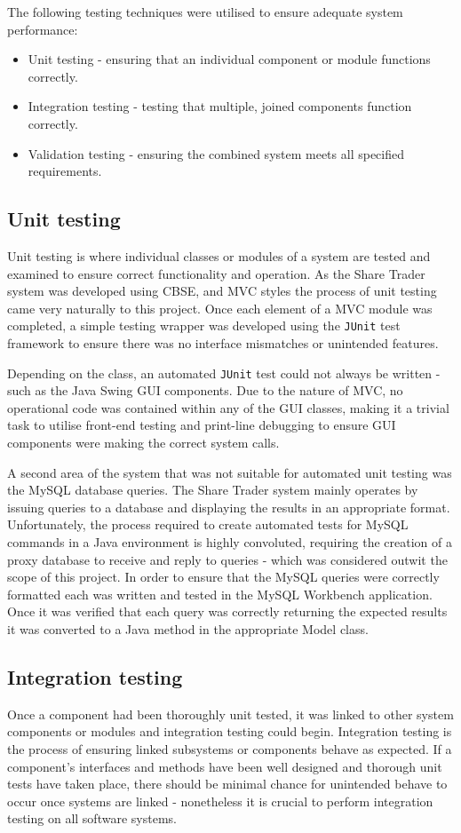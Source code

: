 \documentclass[12pt, a4paper,titlepage]{article}
\begin{document}
The following testing techniques were utilised to ensure adequate system
performance:
\begin{itemize}
    \item Unit testing - ensuring that an individual component or module
    functions correctly.
    \item Integration testing - testing that multiple, joined components
    function correctly.
    \item Validation testing - ensuring the combined system meets all
    specified requirements.
\end{itemize}

\subsection{Unit testing}
Unit testing is where individual classes or modules of a system are tested and
examined to ensure correct functionality and operation. 
As the Share Trader system was developed using CBSE, and MVC styles the
process of unit testing came very naturally to this project.  
Once each element of a MVC module was completed, a simple testing wrapper was
developed  using the {\tt JUnit} test framework to ensure there was no interface
mismatches or unintended features.

Depending on the class, an automated {\tt JUnit} test could not always be
written - such as the Java Swing GUI components. 
Due to the nature of MVC, no operational code was contained within any of the
GUI classes, making it a trivial task to utilise front-end testing and
print-line debugging to ensure GUI components were making the correct system
calls.

A second area of the system that was not suitable for automated unit testing
was the MySQL database queries. 
The Share Trader system mainly operates by issuing queries to a database and
displaying the results in an appropriate format. 
Unfortunately, the process required to create automated tests for
MySQL commands in a Java environment is highly convoluted, requiring the
creation of a proxy database to receive and reply to queries - which was
considered outwit the scope of this project. 
In order to ensure that the MySQL queries were correctly formatted each was
written and tested in the MySQL Workbench application. 
Once it was verified that each query was correctly returning the expected
results it was converted to a Java method in the appropriate Model class.

\subsection{Integration testing}
Once a component had been thoroughly unit tested, it was linked to other
system components or modules and integration testing could begin. 
Integration testing is the process of ensuring linked subsystems or components
behave as expected.
If a component's interfaces and methods have been well designed and
thorough unit tests have taken place, there should be minimal chance for
unintended behave to occur once systems are linked - nonetheless it is crucial
to perform integration testing on all software systems.  
\end{document}
